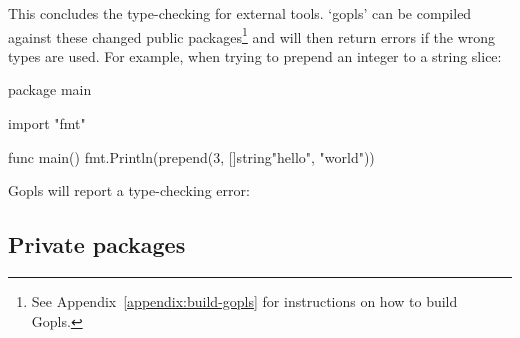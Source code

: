 This concludes the type-checking for external tools.
`gopls' can be compiled against these changed public packages\footnote{
See Appendix~\ref{appendix:build-gopls} for instructions on how to build Gopls.
} and will then return errors if the wrong types are used. For example, when trying
to prepend an integer to a string slice:

\begin{gocode}
package main

import "fmt"

func main() {
	fmt.Println(prepend(3, []string{"hello", "world"}))
}
\end{gocode}

Gopls will report a type-checking error:

\subsection{Private packages}








